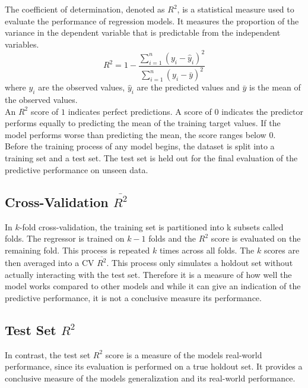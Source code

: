 The coefficient of determination, denoted as $R^2$, is a statistical measure used to evaluate the performance of regression models. It measures the proportion of the variance in the dependent variable that is predictable from the independent variables. 
\begin{equation}
R^2 = 1 - \frac{\sum_{i=1}^n (y_i - \hat{y}_i)^2}{\sum_{i=1}^n (y_i - \bar{y})^2}
\end{equation}
where $y_i$ are the observed values, $\hat{y}_i$ are the predicted values and $\bar{y}$ is the mean of the observed values. \\
An $R^2$ score of $1$ indicates perfect predictions. A score of $0$ indicates the predictor performs equally to predicting the mean of the training target values. If the model performs worse than predicting the mean, the score ranges below $0$. \\
Before the training process of any model begins, the dataset is split into a training set and a test set. The test set is held out for the final evaluation of the predictive performance on unseen data.


\subsection{Cross-Validation $\overline{R^2}$}
In $k$-fold cross-validation, the training set is partitioned into k subsets called folds. The regressor is trained on $k-1$ folds and the $R^2$ score is evaluated on the remaining fold. This process is repeated $k$ times across all folds. The $k$ scores are then averaged into a CV $\overline{R^2}$. This process only simulates a holdout set without actually interacting with the test set. Therefore it is a measure of how well the model works compared to other models and while it can give an indication of the predictive performance, it is not a conclusive measure its performance.

\subsection{Test Set $R^2$}
In contrast, the test set $R^2$ score is a measure of the models real-world performance, since its evaluation is performed on a true holdout set. It provides a conclusive measure of the models generalization and its real-world performance.
